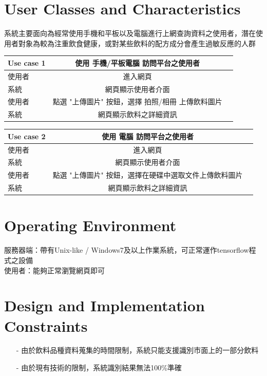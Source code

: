 \documentclass{scrreprt}
\begin{document}
\begin{CJK}{UTF8}{bkai}
\section{User Classes and Characteristics}
系統主要面向為經常使用手機和平板以及電腦進行上網查詢資料之使用者，潛在使用者對象為較為注重飲食健康，或對某些飲料的配方成分會產生過敏反應的人群
\begin{center}
\begin{tabular}{|l|c|r|}\hline
Use case 1 & 使用 手機/平板電腦 訪問平台之使用者\\ \hline
使用者 & 進入網頁\\ \hline
系統 & 網頁顯示使用者介面\\ \hline
使用者 & 點選 "上傳圖片" 按鈕，選擇 拍照/相冊 上傳飲料圖片\\ \hline
系統 & 網頁顯示飲料之詳細資訊\\ \hline
\end{tabular}
\end{center}

\begin{center}
\begin{tabular}{|l|c|r|}\hline
Use case 2 & 使用 電腦 訪問平台之使用者\\ \hline
使用者 & 進入網頁\\ \hline
系統 & 網頁顯示使用者介面\\ \hline
使用者 & 點選 "上傳圖片" 按鈕，選擇在硬碟中選取文件上傳飲料圖片\\ \hline
系統 & 網頁顯示飲料之詳細資訊\\ \hline
\end{tabular}
\end{center}


\section{Operating Environment}
服務器端：帶有Unix-like / Windows7及以上作業系統，可正常運作tensorflow程式之設備\\
使用者：能夠正常瀏覽網頁即可

\section{Design and Implementation Constraints}
\begin{itemize}
\item[-] 由於飲料品種資料蒐集的時間限制，系統只能支援識別市面上的一部分飲料
\item[-] 由於現有技術的限制，系統識別結果無法100\%準確
\end{itemize}


\end{CJK}
\end{document}
